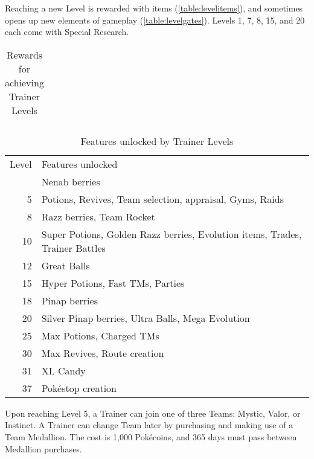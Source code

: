 Reaching a new Level is rewarded with items (\autoref{table:levelitems}),
  and sometimes opens up new elements of gameplay (\autoref{table:levelgates}).
Levels 1, 7, 8, 15, and 20 each come with Special Research.

\begin{table}[ht]
\begin{center}
\begin{tabular}{r r r|r r r}
\end{tabular}
\caption{Rewards for achieving Trainer Levels}
\label{table:levelitems}
\end{center}
\end{table}

\begin{table}[ht]
\begin{center}
  \begin{tabular}{r p{}}
  Level & Features unlocked \\
\Midrule
  2 & Nenab berries \\
  5 & Potions, Revives, Team selection, appraisal, Gyms, Raids \\
  8 & Razz berries, Team Rocket \\
  10 & Super Potions, Golden Razz berries, Evolution items, Trades, Trainer Battles \\
  12 & Great Balls \\
  15 & Hyper Potions, Fast TMs, Parties \\
  18 & Pinap berries \\
  20 & Silver Pinap berries, Ultra Balls, Mega Evolution \\
  25 & Max Potions, Charged TMs \\
  30 & Max Revives, Route creation \\
  31 & XL Candy \\
  37 & Pokéstop creation \\
\end{tabular}
\caption{Features unlocked by Trainer Levels}
\label{table:levelgates}
\end{center}
\end{table}

Upon reaching Level 5, a Trainer can join one of three Teams: Mystic, Valor, or Instinct.
A Trainer can change Team later by purchasing and making use of a Team Medallion.
The cost is 1,000 Pokécoins, and 365 days must pass between Medallion purchases.

